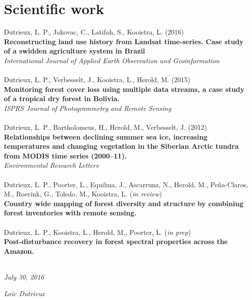 \documentclass[]{friggeri-cv}
\begin{document}
\section{Scientific work}
    Dutrieux, L. P., Jakovac, C., Latifah, S., Kooistra, L. (2016)\\
    \textbf{Reconstructing land use history from Landsat time-series. Case study of a swidden agriculture system in Brazil}\\
    \textit{International Journal of Applied Earth Observation and Geoinformation}\\
    \\
    Dutrieux, L. P., Verbesselt, J., Kooistra, L., Herold, M. (2015)\\
    \textbf{Monitoring forest cover loss using multiple data streams, a case study of a tropical dry forest in Bolivia.}\\
    \textit{ISPRS Journal of Photogrammetry and Remote Sensing}\\
    \\
    Dutrieux, L. P., Bartholomeus, H., Herold, M., Verbesselt, J. (2012)\\
    \textbf{Relationships between declining summer sea ice, increasing temperatures and changing vegetation in the Siberian Arctic tundra from MODIS time series (2000–11).}\\
    \textit{Environmental Research Letters}\\
    \\
    Dutrieux, L. P., Poorter, L., Equihua, J., Ascarrunz, N., Herold, M., Pe\~{n}a-Claros, M., Roerink, G., Toledo, M., Kooistra, L. (\textit{in review})\\
    \textbf{Country wide mapping of forest diversity and structure by combining forest inventories with remote sensing.}\\
    \\
    Dutrieux, L. P., Kooistra, L., Herold, M., Poorter, L. (\textit{in prep})\\
    \textbf{Post-disturbance recovery in forest spectral properties across the Amazon.}\\
    \\


\begin{flushleft}
\emph{July 30, 2016}
\end{flushleft}
\begin{flushright}
\emph{Lo\"{i}c Dutrieux}
\end{flushright}
\end{document}
